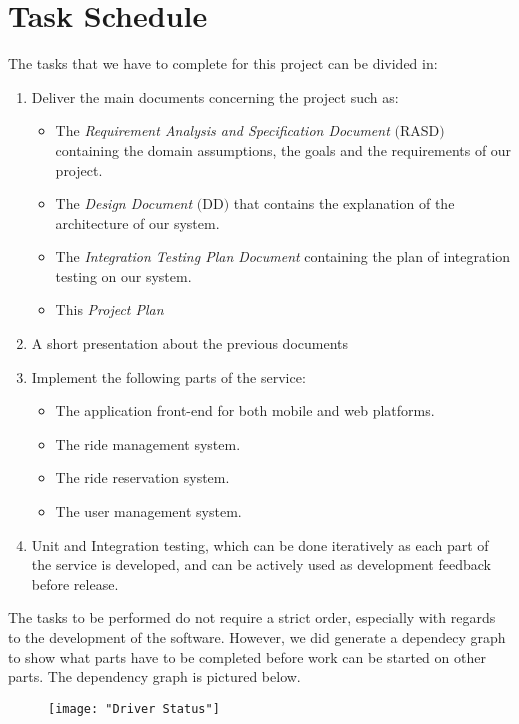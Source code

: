 \section{Task Schedule}
The tasks that we have to complete for this project can be divided in:
\begin{enumerate}
\item Deliver the main documents concerning the project such as:
	\begin{itemize}
		\item The \textit{Requirement Analysis and Specification Document} $($RASD$)$ containing the domain assumptions, the goals and the requirements of our project.
		\item The \textit{Design Document} $($DD$)$ that contains the explanation of the architecture of our system.
		\item The \textit{Integration Testing Plan Document} containing the plan of integration testing on our system.
		\item This \textit{Project Plan}
	\end{itemize}
\item A short presentation about the previous documents
\item Implement the following parts of the service:
	\begin{itemize}
		\item The application front-end for both mobile and web platforms.
		\item The ride management system.
		\item The ride reservation system.
		\item The user management system.
	\end{itemize}
\item Unit and Integration testing, which can be done iteratively as each part of the service is developed, and can be actively used as development feedback before release.
\end{enumerate}

The tasks to be performed do not require a strict order, especially with regards to the development of the software. However, we did generate a dependecy graph to show what parts have
to be completed before work can be started on other parts. The dependency graph is pictured below.

\begin{figure}[h!]
		\centering
		\texttt{[image: "Driver Status"]}
\end{figure}

